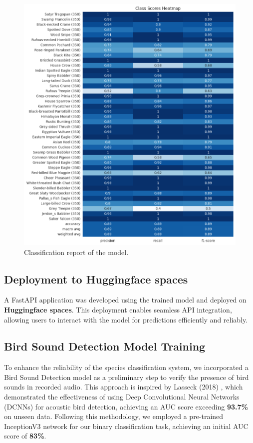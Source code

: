 \begin{figure}[h!]
    \centering
    \includegraphics[scale=0.45]{images/classification_report.png}
    \caption{Classification report of the model.}
    \label{fig:Classification report}
\end{figure}

\newpage
\subsection{Deployment to Huggingface spaces}
A FastAPI application was developed using the trained model and deployed on
\textbf{Huggingface spaces}. This deployment enables seamless API integration,
allowing users to interact with the model for predictions efficiently and
reliably.

\subsection{Bird Sound Detection Model Training}

To enhance the reliability of the species classification system, we
incorporated a Bird Sound Detection model as a preliminary step to verify the
presence of bird sounds in recorded audio. This approach is inspired by Lasseck
(2018) \cite{lasseck2018acoustic}, which demonstrated the effectiveness of
using Deep Convolutional Neural Networks (DCNNs) for acoustic bird detection,
achieving an AUC score exceeding \textbf{93.7\%} on unseen data. Following this
methodology, we employed a pre-trained InceptionV3 network for our binary
classification task, achieving an initial AUC score of \textbf{83\%}.

